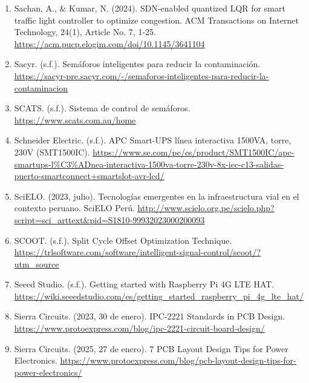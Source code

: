 \documentclass[12pt,a4paper,oneside]{report}
\providecommand{\ul}[1]{\underline{#1}}
\begin{document}
\begin{enumerate}
\item
  Sachan, A., \& Kumar, N. (2024). SDN-enabled quantized LQR for smart traffic light controller to optimize congestion. ACM Transactions on Internet Technology, 24(1), Article No. 7, 1-25. \href{https://acm.pucp.elogim.com/doi/10.1145/3641104}{\ul{https://acm.pucp.elogim.com/doi/10.1145/3641104}}
\item
  Sacyr. (s.f.). Semáforos inteligentes para reducir la contaminación. \href{https://sacyr-pre.sacyr.com/-/semaforos-inteligentes-para-reducir-la-contaminacion}{\ul{https://sacyr-pre.sacyr.com/-/semaforos-inteligentes-para-reducir-la-contaminacion}}
\item
  SCATS. (s.f.). Sistema de control de semáforos. \href{https://www.scats.com.au/home}{\ul{https://www.scats.com.au/home}}
\item
  Schneider Electric. (s.f.). APC Smart-UPS línea interactiva 1500VA, torre, 230V (SMT1500IC). \href{https://www.se.com/pe/es/product/SMT1500IC/apc-smartups-l\%C3\%ADnea-interactiva-1500va-torre-230v-8x-iec-c13-salidas-puerto-smartconnect+smartslot-avr-lcd/}{\ul{https://www.se.com/pe/es/product/SMT1500IC/apc-smartups-l\%C3\%ADnea-interactiva-1500va-torre-230v-8x-iec-c13-salidas-puerto-smartconnect+smartslot-avr-lcd/}}
\item
  SciELO. (2023, julio). Tecnologías emergentes en la infraestructura vial en el contexto peruano. SciELO Perú. \href{http://www.scielo.org.pe/scielo.php?script=sci_arttext&pid=S1810-99932023000200093}{\ul{http://www.scielo.org.pe/scielo.php?script=sci\_arttext\&pid=S1810-99932023000200093}}
\item
  SCOOT. (s.f.). Split Cycle Offset Optimization Technique. \href{https://trlsoftware.com/software/intelligent-signal-control/scoot/?utm_source}{\ul{https://trlsoftware.com/software/intelligent-signal-control/scoot/?utm\_source}}
\item
  Seeed Studio. (s.f.). Getting started with Raspberry Pi 4G LTE HAT. \href{https://wiki.seeedstudio.com/es/getting_started_raspberry_pi_4g_lte_hat/}{\ul{https://wiki.seeedstudio.com/es/getting\_started\_raspberry\_pi\_4g\_lte\_hat/}}
\item
  Sierra Circuits. (2023, 30 de enero). IPC-2221 Standards in PCB Design. \href{https://www.protoexpress.com/blog/ipc-2221-circuit-board-design/}{\ul{https://www.protoexpress.com/blog/ipc-2221-circuit-board-design/}}
\item
  Sierra Circuits. (2025, 27 de enero). 7 PCB Layout Design Tips for Power Electronics. \href{https://www.protoexpress.com/blog/pcb-layout-design-tips-for-power-electronics/}{\ul{https://www.protoexpress.com/blog/pcb-layout-design-tips-for-power-electronics/}}

\end{enumerate}
\end{document}
